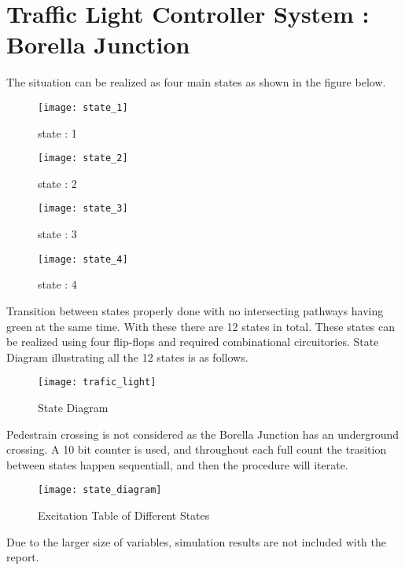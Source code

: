 \documentclass[11pt]{article}
\begin{document}
    \section{Traffic Light Controller System : Borella Junction}
    The situation can be realized as four main states as shown in the figure below.
    \begin{figure}[h]
        \begin{minipage}{.24\textwidth}
            \begin{center}
                \texttt{[image: state\_1]}
                \caption*{state : 1}
            \end{center}
        \end{minipage}
        \begin{minipage}{.24\textwidth}
            \begin{center}
                \texttt{[image: state\_2]}
                \caption*{state : 2}
            \end{center}
        \end{minipage}
        \begin{minipage}{.24\textwidth}
            \begin{center}
                \texttt{[image: state\_3]}
                \caption*{state : 3}
            \end{center}
        \end{minipage}
        \begin{minipage}{.24\textwidth}
            \begin{center}
                \texttt{[image: state\_4]}
                \caption*{state : 4}
            \end{center}
        \end{minipage}
    \end{figure}
    \newline
    Transition between states properly done with no intersecting pathways having green at the same time.
    With these there are 12 states in total. These states can be realized using four flip-flops and required
    combinational circuitories. State Diagram illustrating all the 12 states is as follows.
    \begin{figure}[h]
               \centering
               \texttt{[image: trafic\_light]}
        \caption*{State Diagram}
    \end{figure}

    \newline
    Pedestrain crossing is not considered as the Borella Junction has an underground crossing.
    A 10 bit counter is used, and throughout each full count the trasition between states happen sequentiall,
    and then the procedure will iterate.
    \newpage
    \begin{figure}[h]
        \centering
        \texttt{[image: state\_diagram]}
        \caption*{Excitation Table of Different States}
    \end{figure}
Due to the larger size of variables, simulation results are not included with the report.
\end{document}
